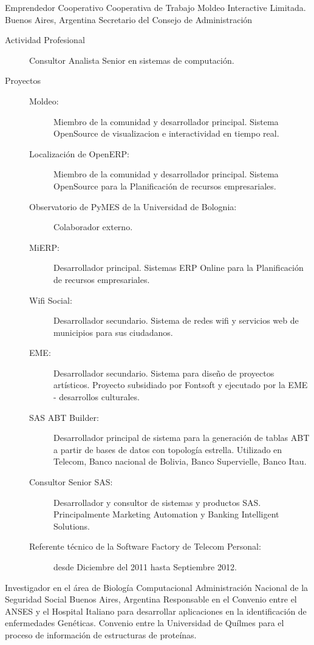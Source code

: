 	{Emprendedor Cooperativo}
	{Cooperativa de Trabajo Moldeo Interactive Limitada.}
	{Buenos Aires, Argentina}
	{Secretario del Consejo de Administración}
	{\begin{description}
	\item [Actividad Profesional] Consultor Analista Senior en sistemas de computación.
	\item [Proyectos]
	\begin{description}
		\item [Moldeo:] Miembro de la comunidad y desarrollador principal. Sistema OpenSource de visualizacion e interactividad en tiempo real.
		\item [Localización de OpenERP:] Miembro de la comunidad y desarrollador principal. Sistema OpenSource para la Planificación de recursos empresariales.
		\item [Observatorio de PyMES de la Universidad de Bolognia:] Colaborador externo.
		\item [MiERP:] Desarrollador principal. Sistemas ERP Online para la Planificación de recursos empresariales.
		\item [Wifi Social:] Desarrollador secundario. Sistema de redes wifi y servicios web de municipios para sus ciudadanos.
		\item [EME:] Desarrollador secundario. Sistema para diseño de proyectos artísticos. Proyecto subsidiado por Fontsoft y ejecutado por la EME - desarrollos culturales.
		\item [SAS ABT Builder:] Desarrollador principal de sistema para la generación de
			tablas ABT a partir de bases de datos con topología estrella. Utilizado
			en Telecom, Banco nacional de Bolivia, Banco Supervielle, Banco Itau.
		\item [Consultor Senior SAS:] Desarrollador y consultor de sistemas y productos SAS. Principalmente Marketing Automation y Banking Intelligent Solutions.
		\item [Referente técnico de la Software Factory de Telecom Personal:] desde Diciembre del 2011 hasta Septiembre 2012.
	\end{description}
	\end{description}}
	{Investigador en el área de Biología Computacional}
	{Administración Nacional de la Seguridad Social}
	{Buenos Aires, Argentina}
	{}
	{Responsable en el Convenio entre el ANSES y el Hospital Italiano para desarrollar
	aplicaciones en la identificación de enfermedades Genéticas. Convenio entre la
	Universidad de Quílmes para el proceso de información de estructuras de proteínas.}
